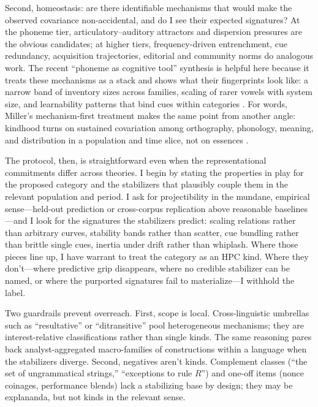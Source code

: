 \documentclass[12pt]{article}
\begin{document}
Second, homeostasis: are there identifiable mechanisms that would make the observed covariance non-accidental, and do I see their expected signatures? At the phoneme tier, articulatory–auditory attractors and dispersion pressures are the obvious candidates; at higher tiers, frequency-driven entrenchment, cue redundancy, acquisition trajectories, editorial and community norms do analogous work. The recent “phoneme as cognitive tool” synthesis is helpful here because it treats these mechanisms as a stack and shows what their fingerprints look like: a narrow band of inventory sizes across families, scaling of rarer vowels with system size, and learnability patterns that bind cues within categories \citep[Fig.\,1; Fig.\,2; Table~1]{Ekstrom2025PhonemeTool}. For words, Miller’s mechanism-first treatment makes the same point from another angle: kindhood turns on sustained covariation among orthography, phonology, meaning, and distribution in a population and time slice, not on essences \citep{Miller2021WordsSpeciesKinds}.

The protocol, then, is straightforward even when the representational commitments differ across theories. I begin by stating the properties in play for the proposed category and the stabilizers that plausibly couple them in the relevant population and period. I ask for projectibility in the mundane, empirical sense—held-out prediction or cross-corpus replication above reasonable baselines—and I look for the signatures the stabilizers predict: scaling relations rather than arbitrary curves, stability bands rather than scatter, cue bundling rather than brittle single cues, inertia under drift rather than whiplash. Where those pieces line up, I have warrant to treat the category as an \textsc{HPC} kind. Where they don't—where predictive grip disappears, where no credible stabilizer can be named, or where the purported signatures fail to materialize—I withhold the label.

Two guardrails prevent overreach. First, scope is local. Cross-linguistic umbrellas such as “resultative” or “ditransitive” pool heterogeneous mechanisms; they are interest-relative classifications rather than single kinds. The same reasoning pares back analyst-aggregated macro-families of constructions within a language when the stabilizers diverge. Second, negatives aren't kinds. Complement classes (“the set of ungrammatical strings,” “exceptions to rule $R$”) and one-off items (nonce coinages, performance blends) lack a stabilizing base by design; they may be explananda, but not kinds in the relevant sense.
\end{document}
